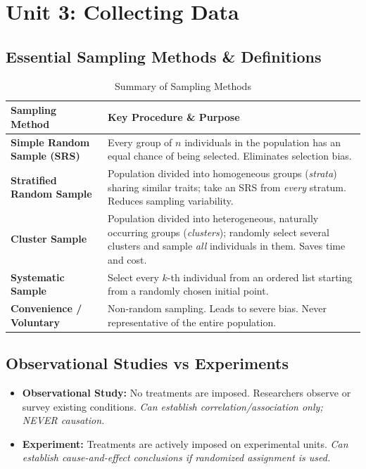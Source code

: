 \chapter{Unit 3: Collecting Data}

\section{Essential Sampling Methods \& Definitions}

\begin{table}[H]
\centering
\small
\begin{tabular}{@{}lp{4.2in}@{}}
\toprule
\textbf{Sampling Method} & \textbf{Key Procedure \& Purpose} \\
\midrule
\textbf{Simple Random Sample (SRS)} & Every group of $n$ individuals in the population has an equal chance of being selected. Eliminates selection bias. \\
\textbf{Stratified Random Sample} & Population divided into homogeneous groups (\emph{strata}) sharing similar traits; take an SRS from \emph{every} stratum. Reduces sampling variability. \\
\textbf{Cluster Sample} & Population divided into heterogeneous, naturally occurring groups (\emph{clusters}); randomly select several clusters and sample \emph{all} individuals in them. Saves time and cost. \\
\textbf{Systematic Sample} & Select every $k$-th individual from an ordered list starting from a randomly chosen initial point. \\
\textbf{Convenience / Voluntary} & Non-random sampling. Leads to severe bias. Never representative of the entire population. \\
\bottomrule
\end{tabular}
\caption{Summary of Sampling Methods}
\end{table}

\section{Observational Studies vs Experiments}

\begin{itemize}
    \item \textbf{Observational Study:} No treatments are imposed. Researchers observe or survey existing conditions. \emph{Can establish correlation/association only; NEVER causation.}
    \item \textbf{Experiment:} Treatments are actively imposed on experimental units. \emph{Can establish cause-and-effect conclusions if randomized assignment is used.}
\end{itemize}

